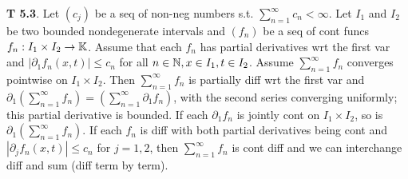 {\bf T 5.3}. Let $(c_j)$ be a seq of non-neg numbers s.t. $\sum_{n=1}^{\infty}c_n < \infty$. Let $I_1$ and $I_2$ be two bounded nondegenerate intervals and $(f_n)$ be a seq of cont funcs $f_n: I_1 \times I_2 \rightarrow \mathbb{K}$. Assume that each $f_n$ has partial derivatives wrt the first var and $|\partial_1 f_n(x,t)|\leq c_n$ for all $n \in \mathbb{N}, x \in I_1, t \in I_2$. Assume  $\sum_{n=1}^{\infty} f_n$ converges pointwise on $I_1 \times I_2$. Then $\sum_{n=1}^{\infty}f_n$ is partially diff wrt the first var and $\partial_1(\sum_{n=1}^{\infty} f_n) = (\sum_{n=1}^{\infty} \partial_1f_n)$, with the second series converging uniformly; this partial derivative is bounded. If each $\partial_1f_n$ is jointly cont on $I_1 \times I_2$, so is $\partial_1 (\sum_{n=1}^{\infty} f_n)$. If each $f_n$ is diff with both partial derivatives being cont and $|\partial_jf_n(x,t)|\leq c_n$ for $j=1,2$, then $\sum_{n=1}^{\infty}f_n$ is cont diff and we can interchange diff and sum (diff term by term). 
